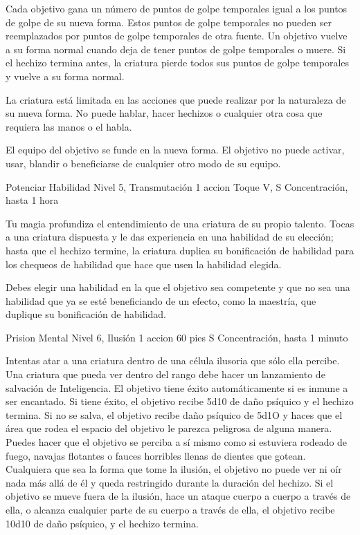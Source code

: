 \documentclass[a4paper,twocolumn,openany,10pt]{dndbook}
\begin{document}
	Cada objetivo gana un número de puntos de golpe temporales igual a los puntos de golpe de su nueva forma. Estos puntos de
	golpe temporales no pueden ser reemplazados por puntos de golpe temporales de otra fuente. Un objetivo vuelve a su forma
	normal cuando deja de tener puntos de golpe temporales o muere. Si el hechizo termina antes, la criatura pierde todos sus
	puntos de golpe temporales y vuelve a su forma normal.
	
	La criatura está limitada en las acciones que puede realizar por la naturaleza de su nueva forma. No puede hablar, hacer
	hechizos o cualquier otra cosa que requiera las manos o el habla.
	
	El equipo del objetivo se funde en la nueva forma. El objetivo no puede activar, usar, blandir o beneficiarse de cualquier
	otro modo de su equipo. 

\spellheader%
	{Potenciar Habilidad}
	{Nivel 5, Transmutación}
	{1 accion}
	{Toque}
	{V, S}
	{Concentración, hasta 1 hora}
	
	Tu magia profundiza el entendimiento de una criatura de su propio talento. Tocas a una criatura dispuesta y le das
	experiencia en una habilidad de su elección; hasta que el hechizo termine, la criatura duplica su bonificación de habilidad
	para los chequeos de habilidad que hace que usen la habilidad elegida.
	
	Debes elegir una habilidad en la que el objetivo sea competente y que no sea una habilidad que ya se esté beneficiando de un
	efecto, como la maestría, que duplique su bonificación de habilidad. 

\spellheader%
	{Prision Mental}
	{Nivel 6, Ilusión}
	{1 accion}
	{60 pies}
	{S}
	{Concentración, hasta 1 minuto}
	
	Intentas atar a una criatura dentro de una célula ilusoria que sólo ella percibe. Una criatura que pueda ver dentro del
	rango debe hacer un lanzamiento de salvación de Inteligencia. El objetivo tiene éxito automáticamente si es inmune a ser
	encantado. Si tiene éxito, el objetivo recibe 5d10 de daño psíquico y el hechizo termina. Si no se salva, el objetivo recibe
	daño psíquico de 5d1O y haces que el área que rodea el espacio del objetivo le parezca peligrosa de alguna manera. Puedes
	hacer que el objetivo se perciba a sí mismo como si estuviera rodeado de fuego, navajas flotantes o fauces horribles llenas
	de dientes que gotean. Cualquiera que sea la forma que tome la ilusión, el objetivo no puede ver ni oír nada más allá de él
	y queda restringido durante la duración del hechizo. Si el objetivo se mueve fuera de la ilusión, hace un ataque cuerpo a
	cuerpo a través de ella, o alcanza cualquier parte de su cuerpo a través de ella, el objetivo recibe 10d10 de daño psíquico,
	y el hechizo termina. 
\end{document}
